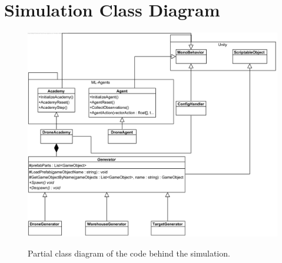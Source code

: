 \chapter{Simulation Class Diagram}
\label{app:sim_class_diagram}

\begin{figure}[h]
	\centering
	\includegraphics[width=\linewidth, angle=-90]{img/simulation_class_diagram}
	\label{fig:class_diagram}
	\caption{Partial class diagram of the code behind the simulation.}
\end{figure}